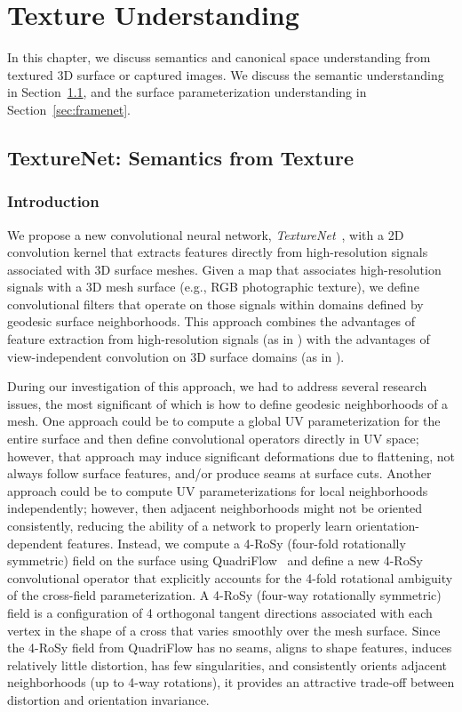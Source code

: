 \chapter{Texture Understanding}
\label{chapter:texturenet}
In this chapter, we discuss semantics and canonical space understanding from textured 3D surface or captured images. We discuss the semantic understanding in Section~\ref{sec:texturenet}, and the surface parameterization understanding in Section~\ref{sec:framenet}.

\section{TextureNet: Semantics from Texture}
\label{sec:texturenet}
\subsection{Introduction}
We propose a new convolutional neural network, \emph{TextureNet}~\cite{huang2018texturenet}, with a 2D convolution kernel that extracts features directly from high-resolution signals associated with 3D surface meshes.  Given a map that associates high-resolution signals with a 3D mesh surface (e.g., RGB photographic texture), we define convolutional filters that operate on those signals within domains defined by geodesic surface neighborhoods.   This approach combines the advantages of feature extraction from high-resolution signals (as in \cite{dai20183dmv}) with the advantages of view-independent convolution on 3D surface domains (as in \cite{tatarchenko2018tangent}).

During our investigation of this approach, we had to address several research issues, the most significant of which is how to define geodesic neighborhoods of a mesh.   One approach could be to compute a global UV parameterization for the entire surface and then define convolutional operators directly in UV space; however, that approach may induce significant deformations due to flattening, not always follow surface features, and/or produce seams at surface cuts.  Another approach could be to compute UV parameterizations for local neighborhoods independently; however, then adjacent neighborhoods might not be oriented consistently, reducing the ability of a network to properly learn orientation-dependent features.   Instead, we compute a 4-RoSy (four-fold rotationally symmetric) field on the surface using QuadriFlow~\cite{huang2018quadriflow} and define a new 4-RoSy convolutional operator that explicitly accounts for the 4-fold rotational ambiguity of the cross-field parameterization. A 4-RoSy (four-way rotationally symmetric) field is a configuration of 4 orthogonal tangent directions associated with each vertex in the shape of a cross that varies smoothly over the mesh surface.  Since the 4-RoSy field from QuadriFlow has no seams, aligns to shape features, induces relatively little distortion, has few singularities, and consistently orients adjacent neighborhoods (up to 4-way rotations), it provides an attractive trade-off between distortion and orientation invariance.

